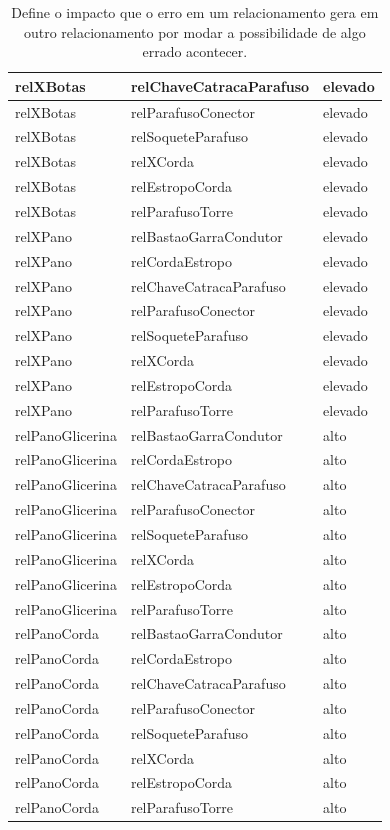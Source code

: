 \documentclass[12pt]{article}
\begin{document}
\begin{table}[H]
\begin{tabular}{|l|l|l|}
relXBotas & relChaveCatracaParafuso & elevado \\ \hline
relXBotas & relParafusoConector & elevado \\ \hline
relXBotas & relSoqueteParafuso & elevado \\ \hline
relXBotas & relXCorda & elevado \\ \hline
relXBotas & relEstropoCorda & elevado \\ \hline
relXBotas & relParafusoTorre & elevado \\ \hline
relXPano & relBastaoGarraCondutor & elevado \\ \hline
relXPano & relCordaEstropo & elevado \\ \hline
relXPano & relChaveCatracaParafuso & elevado \\ \hline
relXPano & relParafusoConector & elevado \\ \hline
relXPano & relSoqueteParafuso & elevado \\ \hline
relXPano & relXCorda & elevado \\ \hline
relXPano & relEstropoCorda & elevado \\ \hline
relXPano & relParafusoTorre & elevado \\ \hline
relPanoGlicerina & relBastaoGarraCondutor & alto \\ \hline
relPanoGlicerina & relCordaEstropo & alto \\ \hline
relPanoGlicerina & relChaveCatracaParafuso & alto \\ \hline
relPanoGlicerina & relParafusoConector & alto \\ \hline
relPanoGlicerina & relSoqueteParafuso & alto \\ \hline
relPanoGlicerina & relXCorda & alto \\ \hline
relPanoGlicerina & relEstropoCorda & alto \\ \hline
relPanoGlicerina & relParafusoTorre & alto \\ \hline
relPanoCorda & relBastaoGarraCondutor & alto \\ \hline
relPanoCorda & relCordaEstropo & alto \\ \hline
relPanoCorda & relChaveCatracaParafuso & alto \\ \hline
relPanoCorda & relParafusoConector & alto \\ \hline
relPanoCorda & relSoqueteParafuso & alto \\ \hline
relPanoCorda & relXCorda & alto \\ \hline
relPanoCorda & relEstropoCorda & alto \\ \hline
relPanoCorda & relParafusoTorre & alto \\ \hline
\end{tabular}
\caption{Define o impacto que o erro em um relacionamento gera em outro relacionamento por modar a possibilidade de algo errado acontecer.}
\label{relation1}
\end{table}
\end{document}
